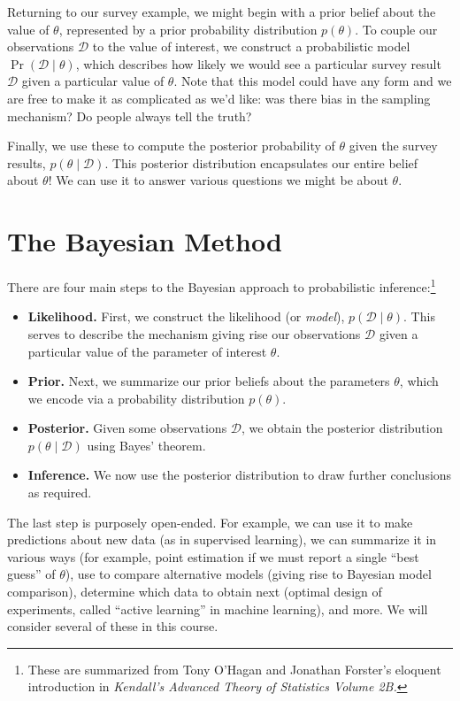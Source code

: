 \documentclass{article}
\newcommand{\given}{\mid}
\newcommand{\mc}[1]{\mathcal{#1}}
\newcommand{\data}{\mc{D}}
\begin{document}
Returning to our survey example, we might begin with a prior belief
about the value of $\theta$, represented by a prior probability
distribution $p(\theta)$. To couple our observations $\data$ to the
value of interest, we construct a probabilistic model $\Pr(\data
\given \theta)$, which describes how likely we would see a particular
survey result $\data$ given a particular value of $\theta$.  Note that
this model could have any form and we are free to make it as
complicated as we'd like: was there bias in the sampling mechanism?
Do people always tell the truth?

Finally, we use these to compute the posterior probability of $\theta$
given the survey results, $p(\theta \given \data)$.  This posterior
distribution encapsulates our entire belief about $\theta$! We can
use it to answer various questions we might be about $\theta$.

\section*{The Bayesian Method}

There are four main steps to the Bayesian approach to probabilistic
inference:\footnote{These are summarized from Tony O'Hagan and
  Jonathan Forster's eloquent introduction in \emph{Kendall's Advanced
    Theory of Statistics Volume 2B.}}
\begin{itemize}
\item \textbf{Likelihood.} First, we construct the likelihood (or
  \emph{model}), $p(\data \given \theta)$.  This serves to describe
  the mechanism giving rise our observations $\data$ given a
  particular value of the parameter of interest $\theta$.
\item \textbf{Prior.} Next, we summarize our prior beliefs about the
  parameters $\theta$, which we encode via a probability distribution
  $p(\theta)$.
\item \textbf{Posterior.} Given some observations $\data$, we obtain
  the posterior distribution $p(\theta \given \data)$ using Bayes'
  theorem.
\item \textbf{Inference.} We now use the posterior distribution to
  draw further conclusions as required.
\end{itemize}
The last step is purposely open-ended. For example, we can use it to
make predictions about new data (as in supervised learning), we can
summarize it in various ways (for example, point estimation if we must
report a single ``best guess'' of $\theta$), use to compare
alternative models (giving rise to Bayesian model comparison),
determine which data to obtain next (optimal design of experiments,
called ``active learning'' in machine learning), and more.  We will
consider several of these in this course.
\end{document}
